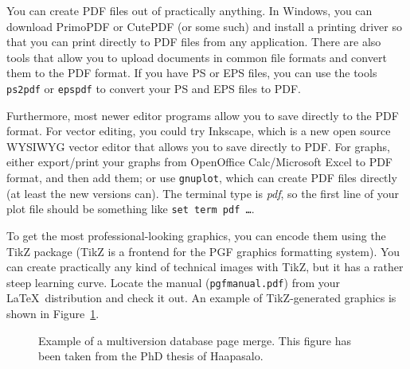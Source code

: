 You can create PDF files out of practically anything.  In Windows, you
can download PrimoPDF or CutePDF (or some such) and install a printing
driver so that you can print directly to PDF files from any
application. There are also tools that allow you to upload documents
in common file formats and convert them to the PDF format.  If you
have PS or EPS files, you can use the tools \texttt{ps2pdf} or
\texttt{epspdf} to convert your PS and EPS files to PDF\@.



Furthermore, most newer editor programs allow you to save directly to the PDF
format. For vector editing, you could try Inkscape, which is a new open source
WYSIWYG vector editor that allows you to save directly to PDF\@. 
For graphs, either export/print your graphs from OpenOffice Calc/Microsoft
Excel to PDF format, and then add them; or use \texttt{gnuplot}, which can
create PDF files directly (at least the new versions can).
The terminal type is \emph{pdf}, so the first line of your plot file should be
something like \texttt{set term pdf \ldots}.

To get the most professional-looking graphics, you can encode them using the
TikZ package (TikZ is a frontend for the PGF graphics formatting system).
You can create practically any kind of technical images with TikZ, but it has a
rather steep learning curve. Locate the manual (\texttt{pgfmanual.pdf}) from
your \LaTeX\ distribution and check it out. An example of TikZ-generated
graphics is shown in Figure~\ref{fig:page-merge}.

\begin{figure}[ht]
  \begin{center}
    
    \caption{Example of a multiversion database page merge. This figure has
    been taken from the PhD thesis of Haapasalo.}
    \label{fig:page-merge}
  \end{center}
\end{figure}

